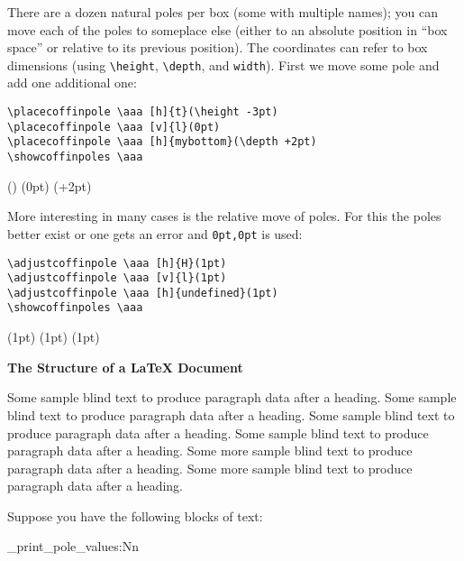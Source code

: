 \documentclass{article}
\newcommand\cbox[2][.8]{{\setlength\fboxsep{0pt}\colorbox[gray]{#1}{#2}}}
\begin{document}
There are a dozen natural poles per box (some with multiple names); you can
move each of the poles to someplace else (either to an absolute position in
``box space'' or relative to its previous position).  The coordinates can
refer to box dimensions (using \verb|\height|, \verb|\depth|,
 and \verb|width|). First we move some pole and add one
additional one:
\begin{verbatim}
\placecoffinpole \aaa [h]{t}(\height -3pt)
\placecoffinpole \aaa [v]{l}(0pt)
\placecoffinpole \aaa [h]{mybottom}(\depth +2pt)
\showcoffinpoles \aaa
\end{verbatim}
\placecoffinpole {}(\height -3pt)
\placecoffinpole {}(0pt)
\placecoffinpole {}(\depth +2pt)
\showcoffinpoles \aaa


More interesting in many cases is the relative move of poles. For this the
poles better exist or one gets an error and \texttt{0pt,0pt} is used:
\begin{verbatim}
\adjustcoffinpole \aaa [h]{H}(1pt)
\adjustcoffinpole \aaa [v]{l}(1pt)
\adjustcoffinpole \aaa [h]{undefined}(1pt)
\showcoffinpoles \aaa
\end{verbatim}
\adjustcoffinpole {}(1pt)
\adjustcoffinpole {}(1pt)
\adjustcoffinpole {}(1pt)
\showcoffinpoles \aaa



\sbox {}

\setvcoffin \bbb {11cm}
   {\raggedleft\normalfont\fontsize{36}{38pt}\bfseries 
    The Structure of a \LaTeX{} Document}

\setvcoffin \ccc {13cm}
   {Some sample blind text to produce paragraph data after a heading.
    Some sample blind text to produce paragraph data after a heading.
    Some sample blind text to produce paragraph data after a heading.
    Some sample blind text to produce paragraph data after a heading.
    \endgraf
    Some more sample blind text to produce paragraph data after a heading.
    Some more sample blind text to produce paragraph data after a heading.
}


Suppose you have the following blocks of text:

\bigskip

\noindent\cbox{\usebox\aaa}

\begin{multicols}{2}
\ttfamily\tiny
\ExplSyntaxOn
   \noindent \coffin_print_pole_values:Nn \aaa \\ 
\ExplSyntaxOff
\end{multicols}
\end{document}
